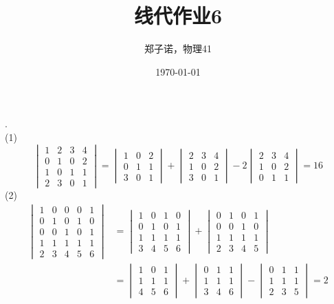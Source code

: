 \documentclass[utf8]{ctexart}
\title{线代作业6}
\author{郑子诺，物理41}
\date{\today}
\begin{document}
\maketitle
{}.\\
(1)
\[\begin{vmatrix}
	1&2&3&4\\
	0&1&0&2\\
	1&0&1&1\\
	2&3&0&1
\end{vmatrix}
=\begin{vmatrix}
	1&0&2\\
	0&1&1\\
	3&0&1
\end{vmatrix}+
\begin{vmatrix}
	2&3&4\\
	1&0&2\\
	3&0&1
\end{vmatrix}
-2\begin{vmatrix}
	2&3&4\\
	1&0&2\\
	0&1&1
\end{vmatrix}
=16\]
(2)
\begin{align*}
	\begin{vmatrix}
		1&0&0&0&1\\
		0&1&0&1&0\\
		0&0&1&0&1\\
		1&1&1&1&1\\
		2&3&4&5&6
	\end{vmatrix}
	&=\begin{vmatrix}
		1&0&1&0\\
		0&1&0&1\\
		1&1&1&1\\
		3&4&5&6
	\end{vmatrix}
	+\begin{vmatrix}
		0&1&0&1\\
		0&0&1&0\\
		1&1&1&1\\
		2&3&4&5
	\end{vmatrix}\\
	&=\begin{vmatrix}
		1&0&1\\
		1&1&1\\
		4&5&6
	\end{vmatrix}+\begin{vmatrix}
	0&1&1\\
	1&1&1\\
	3&4&6
	\end{vmatrix}-\begin{vmatrix}
	0&1&1\\
	1&1&1\\
	2&3&5
	\end{vmatrix}=2
\end{align*}
\end{document}
